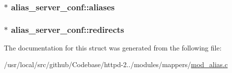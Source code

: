 \subsubsection[{\texorpdfstring{aliases}{aliases}}]{$\ast$ alias\+\_\+server\+\_\+conf\+::aliases}\hypertarget{structalias__server__conf_a49abd1550343e0ebdb42f7524e209262}{}\label{structalias__server__conf_a49abd1550343e0ebdb42f7524e209262}
\subsubsection[{\texorpdfstring{redirects}{redirects}}]{$\ast$ alias\+\_\+server\+\_\+conf\+::redirects}\hypertarget{structalias__server__conf_a2bc2ef79d9f39c3abc8f7ad797cafb48}{}\label{structalias__server__conf_a2bc2ef79d9f39c3abc8f7ad797cafb48}


The documentation for this struct was generated from the following file\+:\begin{DoxyCompactItemize}
\item 
/usr/local/src/github/\+Codebase/httpd-\/2../modules/mappers/\hyperlink{mod__alias_8c}{mod\+\_\+alias.\+c}\end{DoxyCompactItemize}
